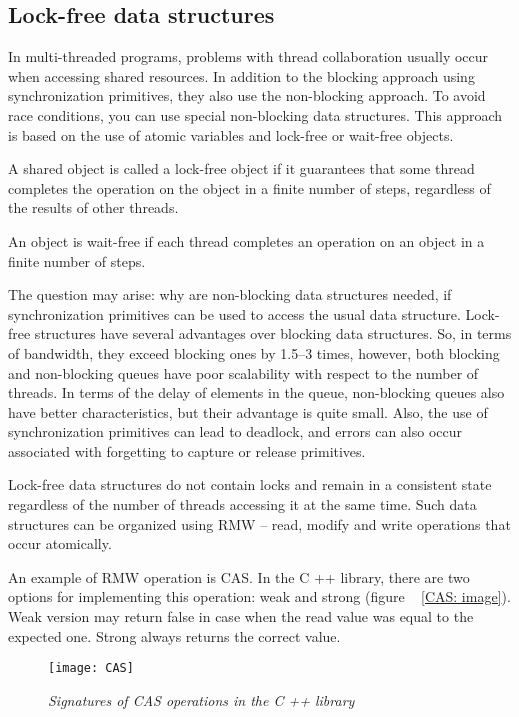 { %
	\subsection{Lock-free data structures}
	\label{lockfree:section}
	\par In multi-threaded programs, problems with thread collaboration usually occur when accessing shared resources. In addition to the blocking approach using synchronization primitives, they also use the non-blocking approach. To avoid race conditions, you can use special non-blocking data structures. This approach is based on the use of atomic variables and lock-free or wait-free objects.
	\par A shared object is called a lock-free object if it guarantees that some thread completes the operation on the object in a finite number of steps, regardless of the results of other threads.
	\par An object is wait-free if each thread completes an operation on an object in a finite number of steps.
	\par The question may arise: why are non-blocking data structures needed, if synchronization primitives can be used to access the usual data structure. Lock-free structures have several advantages over blocking data structures. So, in terms of bandwidth, they exceed blocking ones by 1.5–3 times, however, both blocking and non-blocking queues have poor scalability with respect to the number of threads. In terms of the delay of elements in the queue, non-blocking queues also have better characteristics, but their advantage is quite small. Also, the use of synchronization primitives can lead to deadlock, and errors can also occur associated with forgetting to capture or release primitives.
	\par Lock-free data structures do not contain locks and remain in a consistent state regardless of the number of threads accessing it at the same time. Such data structures can be organized using RMW – read, modify and write operations that occur atomically.
	\par An example of RMW operation is CAS. In the C ++ library, there are two options for implementing this operation: weak and strong (figure ~ \ref{CAS: image}). Weak version may return false in case when the read value was equal to the expected one. Strong always returns the correct value.
	\begin{figure}[H]
		\texttt{[image: CAS]}
		\caption{\textit{Signatures of CAS operations in the C ++ library}}

\end{figure}}
